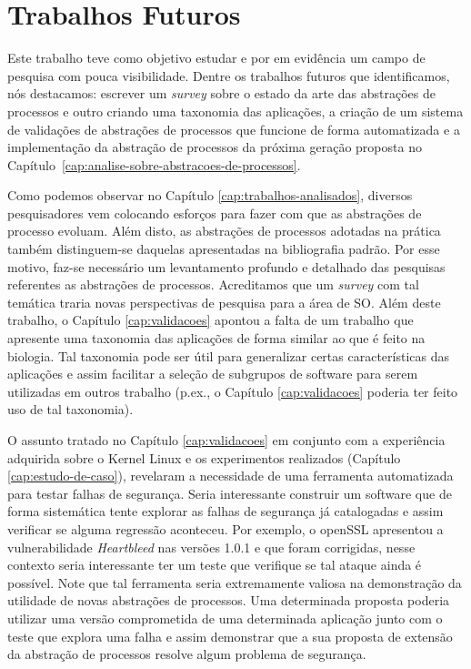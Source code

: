 \section{Trabalhos Futuros}


Este trabalho teve como objetivo estudar e por em evidência um campo de
pesquisa com pouca visibilidade. Dentre os trabalhos futuros que identificamos,
nós destacamos: escrever um \textit{survey} sobre o estado da arte das
abstrações de processos e outro criando uma taxonomia das aplicações, a criação
de um sistema de validações de abstrações de processos que funcione de forma
automatizada e a implementação da abstração de processos da próxima geração
proposta no Capítulo~\ref{cap:analise-sobre-abstracoes-de-processos}.

Como podemos observar no Capítulo \ref{cap:trabalhos-analisados}, diversos
pesquisadores vem colocando esforços para fazer com que as abstrações de
processo evoluam. Além disto, as abstrações de processos adotadas na prática
também distinguem-se daquelas apresentadas na bibliografia padrão. Por esse
motivo, faz-se necessário um levantamento profundo e detalhado das pesquisas
referentes as abstrações de processos. Acreditamos que um
\textit{survey} com tal temática traria novas perspectivas de pesquisa para a
área de SO. Além deste trabalho, o Capítulo \ref{cap:validacoes} apontou a
falta de um trabalho que apresente uma taxonomia das aplicações de forma
similar ao que é feito na biologia.  Tal taxonomia pode ser útil para
generalizar certas características das aplicações e assim facilitar a seleção
de subgrupos de software para serem utilizadas em outros trabalho (p.ex., o
Capítulo \ref{cap:validacoes} poderia ter feito uso de tal taxonomia).

O assunto tratado no Capítulo \ref{cap:validacoes} em conjunto com a experiência adquirida sobre o
Kernel Linux e os experimentos realizados (Capítulo \ref{cap:estudo-de-caso}),
revelaram a necessidade de uma ferramenta automatizada para testar falhas de
segurança. Seria interessante construir um software que de forma sistemática
tente explorar as falhas de segurança já catalogadas e assim verificar se
alguma regressão aconteceu. Por exemplo, o openSSL apresentou a vulnerabilidade
\textit{Heartbleed} nas versões 1.0.1 e que foram corrigidas, nesse contexto
seria interessante ter um teste que verifique se tal ataque ainda é possível.
Note que tal ferramenta seria extremamente valiosa na demonstração da utilidade
de novas abstrações de processos. Uma determinada proposta poderia utilizar uma
versão comprometida de uma determinada aplicação junto com o teste que explora
uma falha e assim demonstrar que a sua proposta de extensão da abstração de
processos resolve algum problema de segurança.

